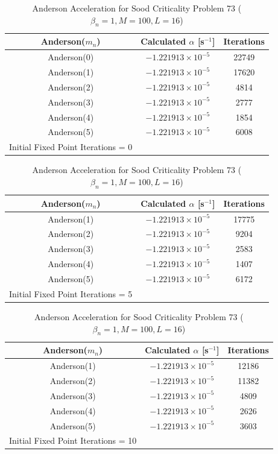 \begin{table}[!htbp]
\caption{Anderson Acceleration for Sood Criticality Problem 73 ($\beta_{n} = 1, M = 100, L = 16$)}
	\label{table:Sood73AA}
	\begin{subtable}[h]{1.0\textwidth}
	\centering{}
	\begin{tabular}{@{}ccc@{}}\toprule
	Anderson($m_{n}$) & Calculated $\alpha$ [s$^{-1}$] & Iterations \\
	\midrule
	Anderson(0) & $-1.221913 \times 10^{-5}$ & 22749 \\
	Anderson(1) & $-1.221913 \times 10^{-5}$ & 17620 \\
	Anderson(2) & $-1.221913 \times 10^{-5}$ & 4814  \\
	Anderson(3) & $-1.221913 \times 10^{-5}$ & 2777  \\
	Anderson(4) & $-1.221913 \times 10^{-5}$ & 1854  \\
	Anderson(5) & $-1.221913 \times 10^{-5}$ & 6008  \\
	\bottomrule
	Initial Fixed Point Iterations = 0
	\end{tabular}
	\end{subtable}%
	\vspace{0.25cm}
	\begin{subtable}[h]{1.0\textwidth}
	\centering{}
	\begin{tabular}{@{}ccc@{}}\toprule
	Anderson($m_{n}$) & Calculated $\alpha$ [s$^{-1}$] & Iterations \\
	\midrule
	Anderson(1) & $-1.221913 \times 10^{-5}$ & 17775 \\
	Anderson(2) & $-1.221913 \times 10^{-5}$ & 9204 \\
	Anderson(3) & $-1.221913 \times 10^{-5}$ & 2583 \\
	Anderson(4) & $-1.221913 \times 10^{-5}$ & 1407 \\
	Anderson(5) & $-1.221913 \times 10^{-5}$ & 6172 \\
	\bottomrule
	Initial Fixed Point Iterations = 5
	\end{tabular}
	\end{subtable}%
	\vspace{0.25cm}
	\begin{subtable}[h]{1.0\textwidth}
	\centering{}
	\begin{tabular}{@{}ccc@{}}\toprule
	Anderson($m_{n}$) & Calculated $\alpha$ [s$^{-1}$] & Iterations \\
	\midrule
	Anderson(1) & $-1.221913 \times 10^{-5}$ & 12186 \\
	Anderson(2) & $-1.221913 \times 10^{-5}$ & 11382 \\
	Anderson(3) & $-1.221913 \times 10^{-5}$ & 4809 \\
	Anderson(4) & $-1.221913 \times 10^{-5}$ & 2626 \\
	Anderson(5) & $-1.221913 \times 10^{-5}$ & 3603 \\
	\bottomrule
	Initial Fixed Point Iterations = 10
	\end{tabular}
	\end{subtable}
\end{table}

